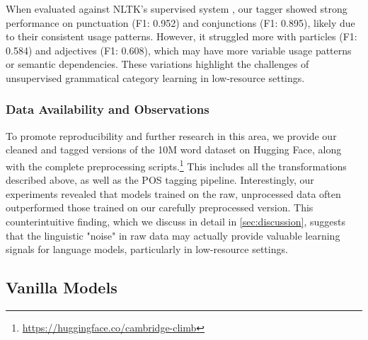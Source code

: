 When evaluated against NLTK's supervised system \cite{bird2009natural}, our tagger showed strong performance on punctuation (F1: 0.952) and conjunctions (F1: 0.895), likely due to their consistent usage patterns. However, it struggled more with particles (F1: 0.584) and adjectives (F1: 0.608), which may have more variable usage patterns or semantic dependencies. These variations highlight the challenges of unsupervised grammatical category learning in low-resource settings.

\subsubsection{Data Availability and Observations}
To promote reproducibility and further research in this area, we provide our cleaned and tagged versions of the 10M word dataset on Hugging Face, along with the complete preprocessing scripts.\footnote{\url{https://huggingface.co/cambridge-climb}} This includes all the transformations described above, as well as the POS tagging pipeline. Interestingly, our experiments revealed that models trained on the raw, unprocessed data often outperformed those trained on our carefully preprocessed version. This counterintuitive finding, which we discuss in detail in \cref{sec:discussion}, suggests that the linguistic "noise" in raw data may actually provide valuable learning signals for language models, particularly in low-resource settings.

\subsection{Vanilla Models}
\label{subsec:baseline}

